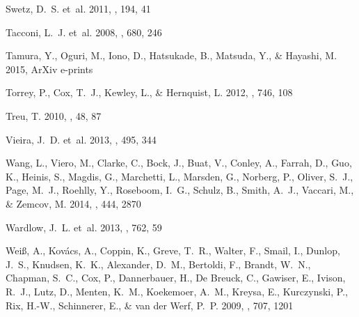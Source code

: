\documentclass[iop]{emulateapj}
\begin{document}
\begin{thebibliography}{107}
{Swetz}, D.~S. {et~al.} 2011, \apjs, 194, 41

{Tacconi}, L.~J. {et~al.} 2008, \apj, 680, 246

{Tamura}, Y., {Oguri}, M., {Iono}, D., {Hatsukade}, B., {Matsuda}, Y., \&
  {Hayashi}, M. 2015, ArXiv e-prints

{Torrey}, P., {Cox}, T.~J., {Kewley}, L., \& {Hernquist}, L. 2012, \apj, 746,
  108

{Treu}, T. 2010, \araa, 48, 87

{Vieira}, J.~D. {et~al.} 2013, \nat, 495, 344

{Wang}, L., {Viero}, M., {Clarke}, C., {Bock}, J., {Buat}, V., {Conley}, A.,
  {Farrah}, D., {Guo}, K., {Heinis}, S., {Magdis}, G., {Marchetti}, L.,
  {Marsden}, G., {Norberg}, P., {Oliver}, S.~J., {Page}, M.~J., {Roehlly}, Y.,
  {Roseboom}, I.~G., {Schulz}, B., {Smith}, A.~J., {Vaccari}, M., \& {Zemcov},
  M. 2014, \mnras, 444, 2870

{Wardlow}, J.~L. {et~al.} 2013, \apj, 762, 59

{Wei{\ss}}, A., {Kov{\'a}cs}, A., {Coppin}, K., {Greve}, T.~R., {Walter}, F.,
  {Smail}, I., {Dunlop}, J.~S., {Knudsen}, K.~K., {Alexander}, D.~M.,
  {Bertoldi}, F., {Brandt}, W.~N., {Chapman}, S.~C., {Cox}, P., {Dannerbauer},
  H., {De Breuck}, C., {Gawiser}, E., {Ivison}, R.~J., {Lutz}, D., {Menten},
  K.~M., {Koekemoer}, A.~M., {Kreysa}, E., {Kurczynski}, P., {Rix}, H.-W.,
  {Schinnerer}, E., \& {van der Werf}, P.~P. 2009, \apj, 707, 1201


\end{thebibliography}
\end{document}
